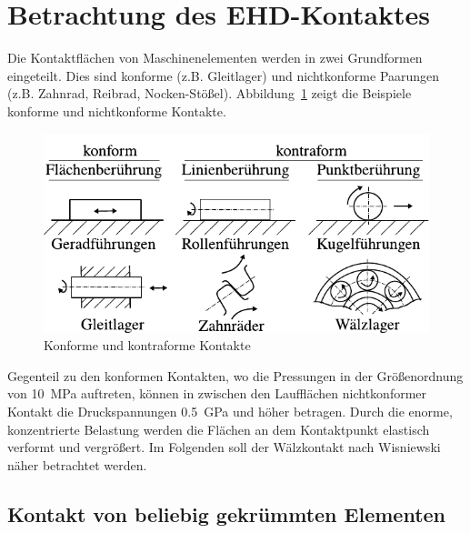 \section{Betrachtung des EHD-Kontaktes}
\label{sec:betrachtung_des_ehd_kontaktes}

Die Kontaktflächen von Maschinenelementen werden in zwei Grundformen eingeteilt.
Dies sind konforme (z.B. Gleitlager) und nichtkonforme Paarungen (z.B. Zahnrad, Reibrad, Nocken-Stößel).
Abbildung~\ref{fig:konforme_kontraforme_kontakte} zeigt die Beispiele konforme und nichtkonforme Kontakte.
\begin{figure}[htb]
    \centering
    \includegraphics[]{./images/konforme_kontraforme_kontakte.pdf}
    \caption{Konforme und kontraforme Kontakte \cite{steinhilper_2008}}
    \label{fig:konforme_kontraforme_kontakte}
\end{figure}
%
Gegenteil zu den konformen Kontakten, wo die Pressungen in der Größenordnung von \SI{10}{\mega\pascal} auftreten, können in zwischen den Laufflächen nichtkonformer Kontakt die Druckspannungen \SI{0.5}{\giga\pascal} und höher betragen.
Durch die enorme, konzentrierte Belastung werden die Flächen an dem Kontaktpunkt elastisch verformt und vergrößert.
Im Folgenden soll der Wälzkontakt nach Wisniewski\cite{wisniewski} näher betrachtet werden.

\subsection{Kontakt von beliebig gekrümmten Elementen}
\label{sub:kontakt_von_beliebig_gekruemmten_elementen}

